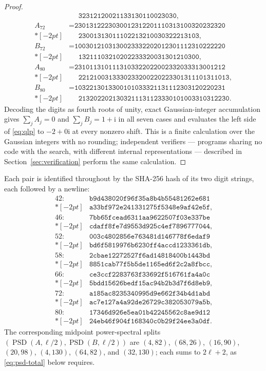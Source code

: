 \documentclass[11pt]{article}
\newcommand{\PSD}{\operatorname{PSD}}
\newcommand{\ii}{\mathrm{i}}
\begin{document}
\begin{proof}
\begin{align*}
      &\phantom{{}={}}\texttt{32312120021133130110023030},\\
A_{72}&=\texttt{2301312223030012312201110313100320232320}\\*[-2pt]
      &\phantom{{}={}}\texttt{23001313011102213210030322213103},\\
B_{72}&=\texttt{1003012103130023332202012301112310222220}\\*[-2pt]
      &\phantom{{}={}}\texttt{13211103210202233320031301210300},\\
A_{80}&=\texttt{2310113101113103322022002332033313001212}\\*[-2pt]
      &\phantom{{}={}}\texttt{2212100313330233200220223301311101311013},\\
B_{80}&=\texttt{1032213013300101033321131112303120220231}\\*[-2pt]
      &\phantom{{}={}}\texttt{2132022021303211131123330101003310312230}.
\end{align*}
Decoding the digits as fourth roots of unity, exact Gaussian-integer
accumulation gives $\sum_j A_j=0$ and $\sum_j B_j=1+\ii$ in all seven cases
and evaluates the left side of \eqref{eq:qlp} to $-2+0\ii$ at every nonzero
shift.  This is a finite calculation over the Gaussian integers with no
rounding; independent verifiers --- programs sharing no code with the search,
with different internal representations --- described in
Section~\ref{sec:verification} perform the same calculation.
\end{proof}

Each pair is identified throughout by the SHA-256 hash of its two digit
strings, each followed by a newline:
\begin{align*}
42:\;&\texttt{b9d438020f96f35a8b4b55481262e681}\\*[-2pt]
    &\texttt{a33bf972e241331275f5348e9af42e5f},\\
46:\;&\texttt{7bb65fcead6311aa9622507f03e337be}\\*[-2pt]
    &\texttt{cdaff8fe7d9553d925c4ef7896777044},\\
52:\;&\texttt{003c4802856e763481d146778f6edaf9}\\*[-2pt]
    &\texttt{bd6f5819976b6230ff4accd1233361db},\\
58:\;&\texttt{2cbae12272527f6ad14818400b1443bd}\\*[-2pt]
    &\texttt{8851cab77f5b5de1165ed6f2c2a8fbcc},\\
66:\;&\texttt{ce3ccf2283763f33692f516761fa4a0c}\\*[-2pt]
    &\texttt{5bdd15626bedf15ac94b2b3d7f6d8eb9},\\
72:\;&\texttt{a185ac8235340995d9e662f34b4d1abd}\\*[-2pt]
    &\texttt{ac7e127a4a92de26729c382053079a5b},\\
80:\;&\texttt{17346d926e5ea01b42245562c8ae9d12}\\*[-2pt]
    &\texttt{24eb46f904f168340c0b29f24ee3a0df}.
\end{align*}
The corresponding midpoint power-spectral splits
$(\PSD(A,\ell/2),\PSD(B,\ell/2))$ are $(4,82)$, $(68,26)$, $(16,90)$,
$(20,98)$, $(4,130)$, $(64,82)$, and $(32,130)$; each sums to $2\ell+2$, as
\eqref{eq:psd-total} below requires.
\end{document}
